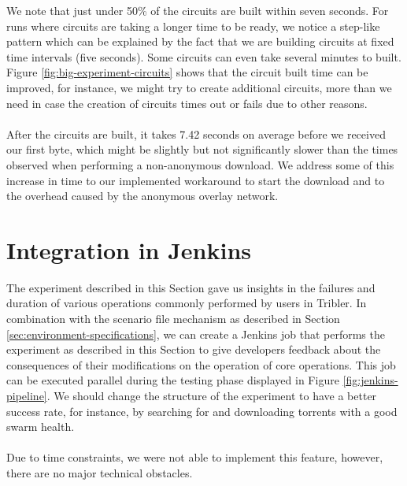 We note that just under 50\% of the circuits are built within seven seconds. For runs where circuits are taking a longer time to be ready, we notice a step-like pattern which can be explained by the fact that we are building circuits at fixed time intervals (five seconds). Some circuits can even take several minutes to built. Figure \ref{fig:big-experiment-circuits} shows that the circuit built time can be improved, for instance, we might try to create additional circuits, more than we need in case the creation of circuits times out or fails due to other reasons.\\\\
After the circuits are built, it takes 7.42 seconds on average before we received our first byte, which might be slightly but not significantly slower than the times observed when performing a non-anonymous download. We address some of this increase in time to our implemented workaround to start the download and to the overhead caused by the anonymous overlay network.

\section{Integration in Jenkins}
The experiment described in this Section gave us insights in the failures and duration of various operations commonly performed by users in Tribler. In combination with the scenario file mechanism as described in Section \ref{sec:environment-specifications}, we can create a Jenkins job that performs the experiment as described in this Section to give developers feedback about the consequences of their modifications on the operation of core operations. This job can be executed parallel during the testing phase displayed in Figure \ref{fig:jenkins-pipeline}. We should change the structure of the experiment to have a better success rate, for instance, by searching for and downloading torrents with a good swarm health.\\\\
Due to time constraints, we were not able to implement this feature, however, there are no major technical obstacles.
